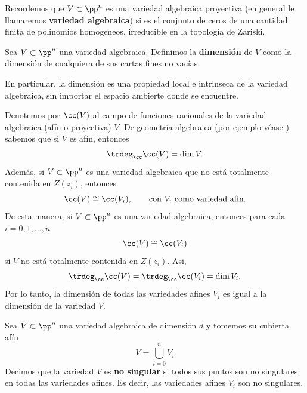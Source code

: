     Recordemos que $V\subset\pp^n$ es una variedad algebraica proyectiva (en general le llamaremos \textbf{variedad algebraica}) si es el conjunto de ceros de una cantidad finita de polinomios homogeneos, irreducible en la topología de Zariski. 
    
    \begin{definition}
		Sea $V\subset\pp^n$ una variedad algebraica. Definimos la \textbf{dimensión} de $V$ como la dimensión de cualquiera de sus cartas fines no vacías.
    \end{definition}
    
    En particular, la dimensión es una propiedad local e intrinseca de la variedad  algebraica, sin importar el espacio ambierte donde se encuentre.
    
        \begin{remark}\label{dimcubierta}
    	Denotemos por $\cc(V)$ al campo de funciones racionales de la variedad algebraica (afín o proyectiva) $V$. De geometría algebraica (por ejemplo véase \parencite[Cap. 1 Sec. 3]{Harts}) sabemos que si $V$ es afín, entonces
    	\begin{equation*}
    		\trdeg_\cc \cc(V)=\dim V.
    	\end{equation*}
    	Además, si $V\subset \pp^n$ es una variedad algebraica que no está totalmente contenida en $Z(z_i)$, entonces 
    	\begin{equation*}
    		\cc(V)\cong \cc(V_i),\qquad \text{con }V_i\text{ como variedad afín}.
    	\end{equation*}
    	De esta manera, si $V\subset\pp^n$ es una variedad algebraica, entonces para cada $i=0,1,\dots, n$ 
    	\begin{equation*}
    		\cc(V)\cong \cc(V_i)
    	\end{equation*}
    	si $V$ no está totalmente contenida en $Z(z_i)$. Asi,
    	\begin{equation*}
    		\trdeg_\cc\cc(V)=\trdeg_\cc\cc(V_i)=\dim V_i.
    	\end{equation*}
    	Por lo tanto, la dimensión de todas las variedades afines $V_i$ es igual a la dimensión de la variedad $V$.
    \end{remark}
    
    \begin{definition}
    	Sea $V\subset\pp^n$ una variedad algebraica de dimensión $d$ y tomemos su cubierta afín
    	\begin{equation*}
    		V=\bigcup_{i=0}^n V_i
    	\end{equation*}
    	Decimos que la variedad $V$ es \textbf{no singular} si todos sus puntos son no singulares en todas las variedades afines. Es decir, las variedades afines $V_i$ son no singulares.
    \end{definition}
    
